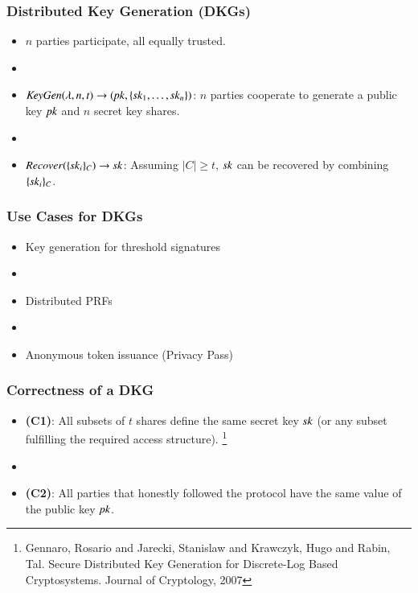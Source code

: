 \documentclass[hyperref={pdfpagelabels=true},table,dvipsnames,14pt,aspectratio=169]{beamer}
\begin{document}
\begin{frame}
  \frametitle{Distributed Key Generation (DKGs)}

  \begin{itemize}
    \item<1-> $n$ parties participate, all equally trusted.
    \item[]
    \item<2-> $\mathit{KeyGen}(\lambda, n, t) \rightarrow (\mathit{pk}, \{\mathit{sk}_1, \ldots, \mathit{sk}_n \})$: $n$ parties cooperate to generate a public key $\mathit{pk}$ and $n$ secret key shares.
    \item[]
    \item<3-> $\mathit{Recover}(\{ \mathit{sk}_i \}_C) \rightarrow \mathit{sk}$: Assuming $\lvert C \rvert \geq t$,
      $\mathit{sk}$ can be recovered by combining $\{ \mathit{sk}_i \}_C$.
  \end{itemize}
\end{frame}

\begin{frame}
  \frametitle{Use Cases for DKGs}

  \begin{itemize}
    \item<1-> Key generation for threshold signatures
    \item[]
    \item<2-> Distributed PRFs
    \item[]
    \item<3-> Anonymous token issuance (Privacy Pass)
  \end{itemize}
\end{frame}

\begin{frame}
  \frametitle{Correctness of a DKG}

  \begin{itemize}
    \item<1-> \textbf{(C1)}: All subsets of $t$ shares define the same secret key $\mathit{sk}$ (or any subset fulfilling the required access structure).
\let\thefootnote\relax\footnote{
Gennaro, Rosario and Jarecki, Stanislaw and Krawczyk, Hugo and Rabin, Tal. Secure Distributed Key Generation for Discrete-Log Based Cryptosystems. Journal of Cryptology, 2007
}
    \item[]
    \item<2-> \textbf{(C2)}: All parties that honestly followed the protocol have the same value of the public key $\mathit{pk}$.
  \end{itemize}
\end{frame}
\end{document}
